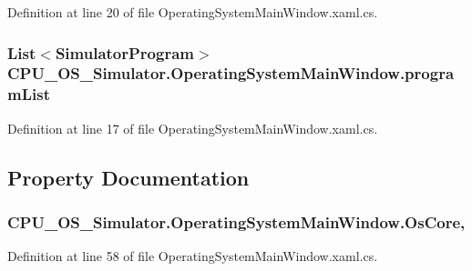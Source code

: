Definition at line 20 of file Operating\+System\+Main\+Window.\+xaml.\+cs.

\hypertarget{class_c_p_u___o_s___simulator_1_1_operating_system_main_window_a83bef5323931616842c44d3f8d477fd2}{}
\subsubsection[{program\+List}]{\setlength{\rightskip}{0pt plus 5cm}List$<${\bf Simulator\+Program}$>$ C\+P\+U\+\_\+\+O\+S\+\_\+\+Simulator.\+Operating\+System\+Main\+Window.\+program\+List\hspace{0.3cm}{\ttfamily [private]}}\label{class_c_p_u___o_s___simulator_1_1_operating_system_main_window_a83bef5323931616842c44d3f8d477fd2}


Definition at line 17 of file Operating\+System\+Main\+Window.\+xaml.\+cs.



\subsection{Property Documentation}
\hypertarget{class_c_p_u___o_s___simulator_1_1_operating_system_main_window_ad714e0ed6e880516f8afc3f1531a2d14}{}
\subsubsection[{Os\+Core}]{ C\+P\+U\+\_\+\+O\+S\+\_\+\+Simulator.\+Operating\+System\+Main\+Window.\+Os\+Core\hspace{0.3cm}{\ttfamily [get]}, {\ttfamily [set]}}\label{class_c_p_u___o_s___simulator_1_1_operating_system_main_window_ad714e0ed6e880516f8afc3f1531a2d14}


Definition at line 58 of file Operating\+System\+Main\+Window.\+xaml.\+cs.

